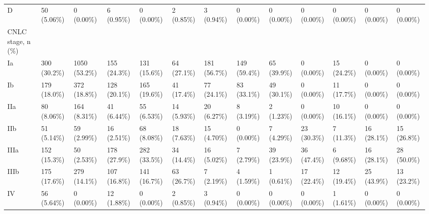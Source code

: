 \begin{landscape}
\begin{center}
\begin{longtable}{p{6.0cm}p{3.0cm}p{3.0cm}p{3.0cm}p{3.0cm}p{3.0cm}p{3.0cm}p{3.0cm}p{3.0cm}p{3.0cm}p{3.0cm}p{3.0cm}p{3.0cm}}
    D &    50 (5.06\%)    &    0 (0.00\%)     &    6 (0.95\%)     &    0 (0.00\%)     &    2 (0.85\%)     &    3 (0.94\%)     &    0 (0.00\%)     &    0 (0.00\%)     &    0 (0.00\%)     &    0 (0.00\%)     &    0 (0.00\%)     &    0 (0.00\%)     \\
CNLC stage, n (\%) &                  &                  &                  &                  &                  &                  &                  &                  &                  &                  &                  &                  \\
    Ia &   300 (30.2\%)    &   1050 (53.2\%)   &   155 (24.3\%)    &   131 (15.6\%)    &    64 (27.1\%)    &   181 (56.7\%)    &   149 (59.4\%)    &    65 (39.9\%)    &    0 (0.00\%)     &    15 (24.2\%)    &    0 (0.00\%)     &    0 (0.00\%)     \\
    Ib &   179 (18.0\%)    &   372 (18.8\%)    &   128 (20.1\%)    &   165 (19.6\%)    &    41 (17.4\%)    &    77 (24.1\%)    &    83 (33.1\%)    &    49 (30.1\%)    &    0 (0.00\%)     &    11 (17.7\%)    &    0 (0.00\%)     &    0 (0.00\%)     \\
    IIa &    80 (8.06\%)    &   164 (8.31\%)    &    41 (6.44\%)    &    55 (6.53\%)    &    14 (5.93\%)    &    20 (6.27\%)    &    8 (3.19\%)     &    2 (1.23\%)     &    0 (0.00\%)     &    10 (16.1\%)    &    0 (0.00\%)     &    0 (0.00\%)     \\
    IIb &    51 (5.14\%)    &    59 (2.99\%)    &    16 (2.51\%)    &    68 (8.08\%)    &    18 (7.63\%)    &    15 (4.70\%)    &    0 (0.00\%)     &    7 (4.29\%)     &    23 (30.3\%)    &    7 (11.3\%)     &    16 (28.1\%)    &    15 (26.8\%)    \\
    IIIa &   152 (15.3\%)    &    50 (2.53\%)    &   178 (27.9\%)    &   282 (33.5\%)    &    34 (14.4\%)    &    16 (5.02\%)    &    7 (2.79\%)     &    39 (23.9\%)    &    36 (47.4\%)    &    6 (9.68\%)     &    16 (28.1\%)    &    28 (50.0\%)    \\
    IIIb &   175 (17.6\%)    &   279 (14.1\%)    &   107 (16.8\%)    &   141 (16.7\%)    &    63 (26.7\%)    &    7 (2.19\%)     &    4 (1.59\%)     &    1 (0.61\%)     &    17 (22.4\%)    &    12 (19.4\%)    &    25 (43.9\%)    &    13 (23.2\%)    \\
    IV &    56 (5.64\%)    &    0 (0.00\%)     &    12 (1.88\%)    &    0 (0.00\%)     &    2 (0.85\%)     &    3 (0.94\%)     &    0 (0.00\%)     &    0 (0.00\%)     &    0 (0.00\%)     &    1 (1.61\%)     &    0 (0.00\%)     &    0 (0.00\%)     \\

\end{longtable}
\end{center}
\end{landscape}
